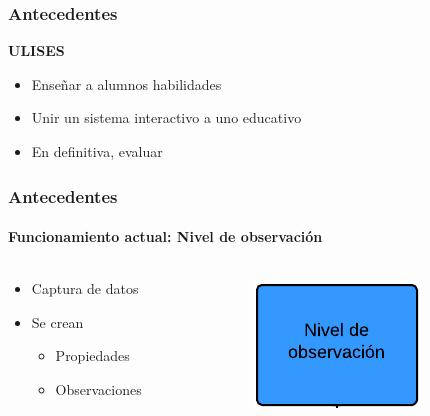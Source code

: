 \begin{frame}
	\frametitle{Antecedentes}
	\textbf{ULISES}
	
	\begin{itemize}
		\item Ense\~nar a alumnos habilidades
		\item Unir un sistema interactivo a uno educativo
		\item En definitiva, evaluar
	\end{itemize}
\end{frame}


\begin{frame}
	\frametitle{Antecedentes}
	\framesubtitle{Funcionamiento actual: Nivel de observaci\'on}
	
	\begin{columns}[T] %
		\begin{column}[T]{5cm} %
			\begin{itemize}
				\item Captura de datos
				\item Se crean
				\begin{itemize}
					\item Propiedades
					\item Observaciones
				\end{itemize}
			\end{itemize}
		\end{column}
		\begin{column}[T]{5cm} %
			\includegraphics[width=0.5\linewidth]{./Figures/NivelDeObservacion.png}
		\end{column}
	\end{columns}
\end{frame}


